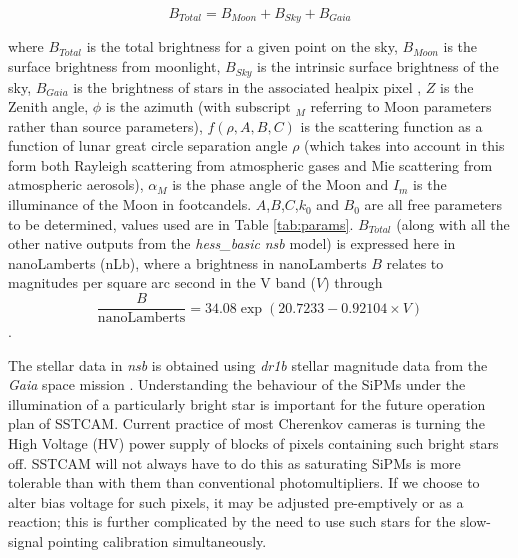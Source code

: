 \begin{equation}
    B_{Total}=B_{Moon}+B_{Sky}+B_{Gaia}
\end{equation}

where $B_{Total}$ is the total brightness for a given point on the sky, $B_{Moon}$ is the surface brightness from moonlight, $B_{Sky}$ is the intrinsic surface brightness of the sky, $B_{Gaia}$ is the brightness of stars in the associated healpix pixel \cite{healpix}, $Z$ is the Zenith angle, $\phi$ is the azimuth (with subscript $_M$ referring to Moon parameters rather than source parameters), $f(\rho,A,B,C)$ is the scattering function as a function of lunar great circle separation angle $\rho$ (which takes into account in this form both Rayleigh scattering from atmospheric gases and Mie scattering from atmospheric aerosols), $\alpha_M$ is the phase angle of the Moon and $I_m$ is the illuminance of the Moon in footcandels. $A$,$B$,$C$,$k_0$ and $B_0$ are all free parameters to be determined, values used are in Table \ref{tab:params}. $B_{Total}$ (along with all the other native outputs from the \textit{hess\_basic} \textit{nsb} model) is expressed here in nanoLamberts (nLb), where a brightness in nanoLamberts $B$ relates to magnitudes per square arc second in the V band ($V$) through
\begin{equation}
    \frac{B}{\textrm{nanoLamberts}}=34.08\exp(20.7233-0.92104\times V)
\end{equation}
\cite{Krisciunas}.

The stellar data in \textit{nsb} is obtained using \textit{dr1b} stellar magnitude data from the \textit{Gaia} space mission \cite{gaiadr1a} \cite{gaiadr1b}. Understanding the behaviour of the SiPMs under the illumination of a particularly bright star is important for the future operation plan of SSTCAM. Current practice of most Cherenkov cameras is turning the High Voltage (HV) power supply of blocks of pixels containing such bright stars off. SSTCAM will not always have to do this as saturating SiPMs is more tolerable than with them than conventional photomultipliers. If we choose to alter bias voltage for such pixels, it may be adjusted pre-emptively or as a reaction; this is further complicated by the need to use such stars for the slow-signal pointing calibration simultaneously. 

